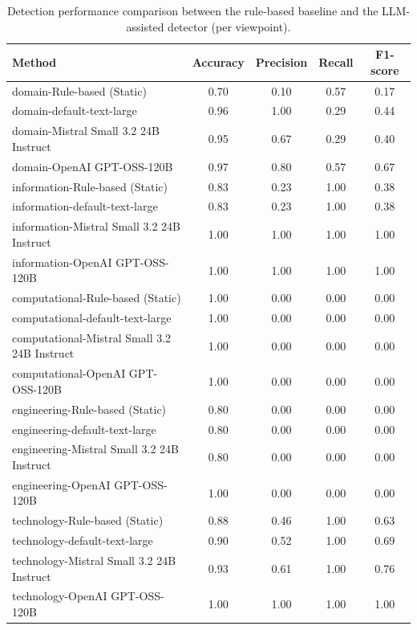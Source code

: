 \begin{table}[h]
\centering
\caption{Detection performance comparison between the rule-based baseline and the LLM-assisted detector (per viewpoint).}
\label{tab:detection_performance_by_viewpoint}
\footnotesize
\begin{tabular}{lcccc}
\hline
\textbf{Method} & \textbf{Accuracy} & \textbf{Precision} & \textbf{Recall} & \textbf{F1-score} \\
\hline
domain-Rule-based (Static) & 0.70 & 0.10 & 0.57 & 0.17 \\
domain-default-text-large & 0.96 & 1.00 & 0.29 & 0.44 \\
domain-Mistral Small 3.2 24B Instruct & 0.95 & 0.67 & 0.29 & 0.40 \\
domain-OpenAI GPT-OSS-120B & 0.97 & 0.80 & 0.57 & 0.67 \\
\hline
information-Rule-based (Static) & 0.83 & 0.23 & 1.00 & 0.38 \\
information-default-text-large & 0.83 & 0.23 & 1.00 & 0.38 \\
information-Mistral Small 3.2 24B Instruct & 1.00 & 1.00 & 1.00 & 1.00 \\
information-OpenAI GPT-OSS-120B & 1.00 & 1.00 & 1.00 & 1.00 \\
\hline
computational-Rule-based (Static) & 1.00 & 0.00 & 0.00 & 0.00 \\
computational-default-text-large & 1.00 & 0.00 & 0.00 & 0.00 \\
computational-Mistral Small 3.2 24B Instruct & 1.00 & 0.00 & 0.00 & 0.00 \\
computational-OpenAI GPT-OSS-120B & 1.00 & 0.00 & 0.00 & 0.00 \\
\hline
engineering-Rule-based (Static) & 0.80 & 0.00 & 0.00 & 0.00 \\
engineering-default-text-large & 0.80 & 0.00 & 0.00 & 0.00 \\
engineering-Mistral Small 3.2 24B Instruct & 0.80 & 0.00 & 0.00 & 0.00 \\
engineering-OpenAI GPT-OSS-120B & 1.00 & 0.00 & 0.00 & 0.00 \\
\hline
technology-Rule-based (Static) & 0.88 & 0.46 & 1.00 & 0.63 \\
technology-default-text-large & 0.90 & 0.52 & 1.00 & 0.69 \\
technology-Mistral Small 3.2 24B Instruct & 0.93 & 0.61 & 1.00 & 0.76 \\
technology-OpenAI GPT-OSS-120B & 1.00 & 1.00 & 1.00 & 1.00 \\
\hline
\end{tabular}
\end{table}